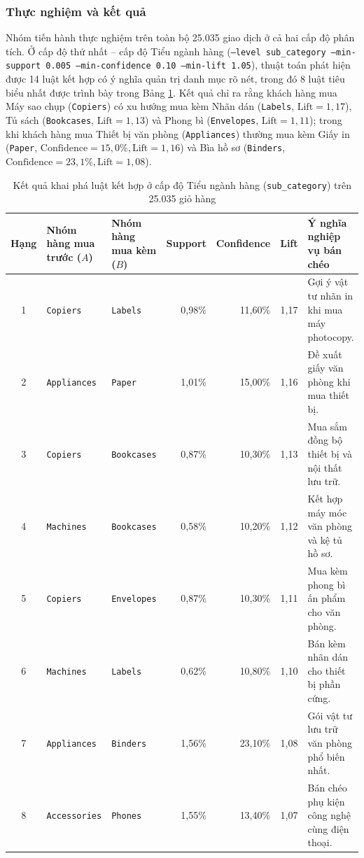 \subsubsection{Thực nghiệm và kết quả}

Nhóm tiến hành thực nghiệm trên toàn bộ 25.035 giao dịch ở cả hai cấp độ phân tích. Ở cấp độ thứ nhất -- cấp độ Tiểu ngành hàng (\texttt{--level sub\_category --min-support 0.005 --min-confidence 0.10 --min-lift 1.05}), thuật toán phát hiện được 14 luật kết hợp có ý nghĩa quản trị danh mục rõ nét, trong đó 8 luật tiêu biểu nhất được trình bày trong Bảng \ref{tab:assoc_subcat}. Kết quả chỉ ra rằng khách hàng mua Máy sao chụp (\texttt{Copiers}) có xu hướng mua kèm Nhãn dán (\texttt{Labels}, $\text{Lift} = 1,17$), Tủ sách (\texttt{Bookcases}, $\text{Lift} = 1,13$) và Phong bì (\texttt{Envelopes}, $\text{Lift} = 1,11$); trong khi khách hàng mua Thiết bị văn phòng (\texttt{Appliances}) thường mua kèm Giấy in (\texttt{Paper}, $\text{Confidence} = 15,0\%, \text{Lift} = 1,16$) và Bìa hồ sơ (\texttt{Binders}, $\text{Confidence} = 23,1\%, \text{Lift} = 1,08$).

\begin{table}[H]
\centering
\caption{Kết quả khai phá luật kết hợp ở cấp độ Tiểu ngành hàng (\texttt{sub\_category}) trên 25.035 giỏ hàng}
\label{tab:assoc_subcat}
\footnotesize
\renewcommand{\arraystretch}{1.22}
\begin{tabularx}{\textwidth}{|c|l|l|r|r|r|X|}
\hline
\textbf{Hạng} & \textbf{Nhóm hàng mua trước ($A$)} & \textbf{Nhóm hàng mua kèm ($B$)} & \textbf{Support} & \textbf{Confidence} & \textbf{Lift} & \textbf{Ý nghĩa nghiệp vụ bán chéo} \\
\hline
1 & \texttt{Copiers} & \texttt{Labels} & 0,98\% & 11,60\% & 1,17 & Gợi ý vật tư nhãn in khi mua máy photocopy. \\
\hline
2 & \texttt{Appliances} & \texttt{Paper} & 1,01\% & 15,00\% & 1,16 & Đề xuất giấy văn phòng khi mua thiết bị. \\
\hline
3 & \texttt{Copiers} & \texttt{Bookcases} & 0,87\% & 10,30\% & 1,13 & Mua sắm đồng bộ thiết bị và nội thất lưu trữ. \\
\hline
4 & \texttt{Machines} & \texttt{Bookcases} & 0,58\% & 10,20\% & 1,12 & Kết hợp máy móc văn phòng và kệ tủ hồ sơ. \\
\hline
5 & \texttt{Copiers} & \texttt{Envelopes} & 0,87\% & 10,30\% & 1,11 & Mua kèm phong bì ấn phẩm cho văn phòng. \\
\hline
6 & \texttt{Machines} & \texttt{Labels} & 0,62\% & 10,80\% & 1,10 & Bán kèm nhãn dán cho thiết bị phần cứng. \\
\hline
7 & \texttt{Appliances} & \texttt{Binders} & 1,56\% & 23,10\% & 1,08 & Gói vật tư lưu trữ văn phòng phổ biến nhất. \\
\hline
8 & \texttt{Accessories} & \texttt{Phones} & 1,55\% & 13,40\% & 1,07 & Bán chéo phụ kiện công nghệ cùng điện thoại. \\
\hline
\end{tabularx}
\end{table}

